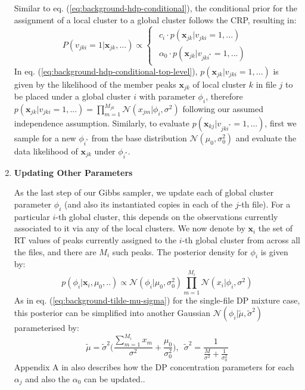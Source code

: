 \begin{enumerate}
Similar to eq. (\ref{eq:background-hdp-conditional}), the conditional prior for the assignment of a local cluster to a global cluster follows the CRP, resulting in:
\begin{dmath}
P(v_{jki}=1 \vert \boldsymbol{x}_{jk}, ...)\propto\begin{cases}
\begin{array}{c}
c_{i}\cdot p(\boldsymbol{x}_{jk} \vert v_{jki}=1,...)\\
\alpha_{0}\cdot p(\boldsymbol{x}_{jk} \vert v_{jki^{*}}=1,...)
\end{array}\end{cases}\label{eq:background-hdp-conditional-top-level}
\end{dmath}
In eq. (\ref{eq:background-hdp-conditional-top-level}), $p(\boldsymbol{x}_{jk} \vert v_{jki}=1,...)$ is given by the likelihood of the member peaks $\boldsymbol{x}_{jk}$ of local cluster $k$ in file $j$ to be placed under a global cluster $i$ with parameter $\phi_{i}$, therefore $p(\boldsymbol{x}_{jk} \vert v_{jki}=1,...) = \prod_{m=1}^{M_{jk}} \mathcal{N}(x_{jm} \vert \phi_{i}, \sigma^2)$ following our assumed independence assumption. Similarly, to evaluate $p(\boldsymbol{x}_{kj} \vert v_{jki^{*}}=1,...)$, first we sample for a new $\phi_{i^{*}}$ from the base distribution $\mathcal{N}(\mu_0, \sigma_0^2)$ and evaluate the data likelihood of $\boldsymbol{x}_{jk}$ under $\phi_{i^{*}}$. 

\item \textbf{Updating Other Parameters}

As the last step of our Gibbs sampler, we update each of global cluster parameter $\phi_i$ (and also its instantiated copies in each of the $j$-th file). For a particular $i$-th global cluster, this depends on the observations currently associated to it via any of the local clusters. We now denote by $\boldsymbol{x}_{i}$ the set of RT values of peaks currently assigned to the $i$-th global cluster from across all the files, and there are $M_i$ such peaks. The posterior density for $\phi_i$ is given by:
\begin{equation}
p(\phi_i \vert \boldsymbol{x}_i, \mu_0, ..) \propto \mathcal{N}(\phi_i \vert \mu_0, \sigma_0^2) \prod_{m=1}^{M_i} \mathcal{N}(x_i \vert \phi_i, \sigma^2)
\end{equation}
As in eq. (\ref{eq:background-tilde-mu-sigma}) for the single-file DP mixture case, this posterior can be simplified into another Gaussian $\mathcal{N}(\phi_i \vert \tilde{\mu}, \tilde{\sigma}^2)$ parameterised by:
\begin{equation}
\tilde{\mu} = \tilde{\sigma}^2 \bigg( \frac{\sum_{m=1}^{M_i} x_m}{\sigma^2} + \frac{\mu_0}{\sigma_0^2} \bigg), \enspace
\tilde{\sigma}^2 = \frac{1}{\frac{M}{\sigma^2} + \frac{1}{\sigma^2_0}} 
\label{eq:background-tilde-hdp-posterior}
\end{equation}
Appendix A in \cite{teh2005hierarchical} also describes how the DP concentration parameters for each $\alpha_j$ and also the $\alpha_0$ can be updated..

\end{enumerate}

